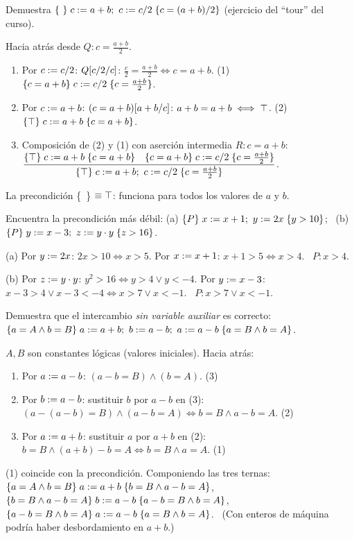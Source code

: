 \begin{prob}
Demuestra $\{\ \}\;c\mathrel{:=} a+b;\ c\mathrel{:=} c/2\;\{c=(a+b)/2\}$ (ejercicio del ``tour'' del curso).
\end{prob}
\begin{sol}
Hacia atrás desde $Q: c=\frac{a+b}{2}$.
\begin{enumerate}
\item Por $c\mathrel{:=} c/2$: $Q[c/2/c]$: $\frac c2=\frac{a+b}2\iff c=a+b$. \quad (1) $\{c=a+b\}\;c\mathrel{:=} c/2\;\{c=\tfrac{a+b}2\}$.
\item Por $c\mathrel{:=} a+b$: $(c=a+b)[a+b/c]$: $a+b=a+b\iff\top$. \quad (2) $\{\top\}\;c\mathrel{:=} a+b\;\{c=a+b\}$.
\item Composición de (2) y (1) con aserción intermedia $R: c=a+b$:
$\dfrac{\{\top\}\;c\mathrel{:=} a+b\;\{c=a+b\}\quad\{c=a+b\}\;c\mathrel{:=} c/2\;\{c=\frac{a+b}2\}}{\{\top\}\;c\mathrel{:=} a+b;\ c\mathrel{:=} c/2\;\{c=\frac{a+b}2\}}$.
\end{enumerate}
La precondición \{\ \} $\equiv\top$: funciona para todos los valores de $a$ y $b$.
\end{sol}

\begin{prob}
Encuentra la precondición más débil: (a) $\{P\}\;x\mathrel{:=} x+1;\ y\mathrel{:=} 2x\;\{y>10\}$; \ (b) $\{P\}\;y\mathrel{:=} x-3;\ z\mathrel{:=} y\cdot y\;\{z>16\}$.
\end{prob}
\begin{sol}
(a) Por $y\mathrel{:=}2x$: $2x>10\iff x>5$. Por $x\mathrel{:=} x+1$: $x+1>5\iff x>4$. \ $P: x>4$.

(b) Por $z\mathrel{:=} y\cdot y$: $y^2>16\iff y>4\lor y<-4$. Por $y\mathrel{:=} x-3$: $x-3>4\lor x-3<-4\iff x>7\lor x<-1$. \ $P: x>7\lor x<-1$.
\end{sol}

\begin{prob}
Demuestra que el intercambio \emph{sin variable auxiliar} es correcto:
$\hoare{a=A\land b=B}{a\asg a+b;\ b\asg a-b;\ a\asg a-b}{a=B\land b=A}$.
\end{prob}
\begin{sol}
$A,B$ son constantes lógicas (valores iniciales). Hacia atrás:
\begin{enumerate}
\item Por $a\mathrel{:=} a-b$: $(a-b=B)\land(b=A)$. \hfill (3)
\item Por $b\mathrel{:=} a-b$: sustituir $b$ por $a-b$ en (3): $(a-(a-b)=B)\land(a-b=A)\iff b=B\land a-b=A$. \hfill (2)
\item Por $a\mathrel{:=} a+b$: sustituir $a$ por $a+b$ en (2): $b=B\land (a+b)-b=A\iff b=B\land a=A$. \hfill (1)
\end{enumerate}
(1) coincide con la precondición. Componiendo las tres ternas:
$\{a=A\land b=B\}\;a\mathrel{:=} a+b\;\{b=B\land a-b=A\}$, $\{b=B\land a-b=A\}\;b\mathrel{:=} a-b\;\{a-b=B\land b=A\}$, $\{a-b=B\land b=A\}\;a\mathrel{:=} a-b\;\{a=B\land b=A\}$. \checkmark\ (Con enteros de máquina podría haber desbordamiento en $a+b$.)
\end{sol}

